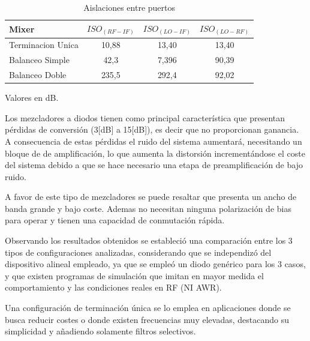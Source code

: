 \documentclass[twocolumn]{article}
\begin{document}
\begin{table}[h]
	\begin{adjustbox}{width=\columnwidth,center}
  \begin{threeparttable}
     \begin{tabular}{lccc}
        \toprule
        Mixer 				&$ISO_{(RF-IF)}$ 	& $ISO_{(LO-IF)}$ 	& $ISO_{(LO-RF)}$ \\
        \midrule
        Terminacion Unica   & 10,88        		& 13,40    			& 13,40 \\
        Balanceo Simple     & 42,3        		& 7,396    			& 90,39 \\
        Balanceo Doble    	& 235,5        		& 292,4    			& 92,02 \\
        \bottomrule
     \end{tabular}
    \begin{tablenotes}
      \small
      \item Valores en dB.
    \end{tablenotes}
    \caption{Aislaciones entre puertos}
  \end{threeparttable}
  \end{adjustbox}
\end{table}

Los mezcladores a diodos tienen como principal característica que presentan pérdidas de conversión (3[dB] a 15[dB]), es decir que no proporcionan ganancia. A consecuencia de estas pérdidas el ruido del sistema aumentará, necesitando un bloque de de amplificación, lo que aumenta la distorsión incrementándose el coste del sistema debido a que se hace necesario una etapa de preamplificación de bajo ruido.

A favor de este tipo de mezcladores se puede resaltar que presenta un ancho de banda grande y bajo coste. Ademas no necesitan ninguna polarización de bias para operar y tienen una capacidad de conmutación rápida.

Observando los resultados obtenidos se estableció una comparación entre los 3 tipos de configuraciones analizadas, considerando que se independizó del dispositivo alineal empleado, ya que se empleó un diodo genérico para los 3 casos, y que existen programas de simulación que imitan en mayor medida el comportamiento y las condiciones reales en RF (NI AWR). 

 Una configuración de terminación única se lo emplea en aplicaciones donde se busca reducir costes o donde existen frecuencias muy elevadas, destacando su simplicidad y añadiendo solamente filtros selectivos.
 
\end{document}
